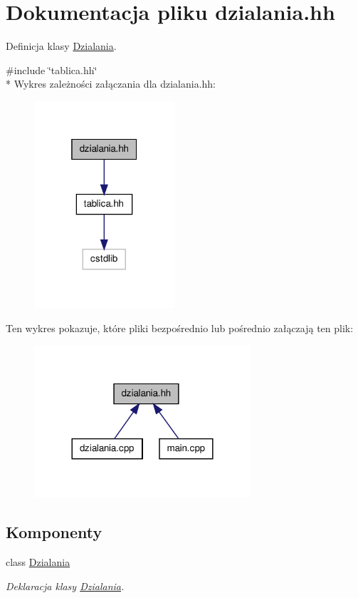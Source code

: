 \hypertarget{dzialania_8hh}{\section{Dokumentacja pliku dzialania.\-hh}
\label{dzialania_8hh}
}


Definicja klasy \hyperlink{class_dzialania}{Dzialania}.  


{\ttfamily \#include \char`\"{}tablica.\-hh\char`\"{}}\\*
Wykres zależności załączania dla dzialania.\-hh\-:\nopagebreak
\begin{figure}[H]
\begin{center}
\leavevmode
\includegraphics[width=148pt]{dzialania_8hh__incl}
\end{center}
\end{figure}
Ten wykres pokazuje, które pliki bezpośrednio lub pośrednio załączają ten plik\-:\nopagebreak
\begin{figure}[H]
\begin{center}
\leavevmode
\includegraphics[width=228pt]{dzialania_8hh__dep__incl}
\end{center}
\end{figure}
\subsection*{Komponenty}
\begin{DoxyCompactItemize}
\item 
class \hyperlink{class_dzialania}{Dzialania}
\begin{DoxyCompactList}\small\item\em Deklaracja klasy \hyperlink{class_dzialania}{Dzialania}. \end{DoxyCompactList}\end{DoxyCompactItemize}
